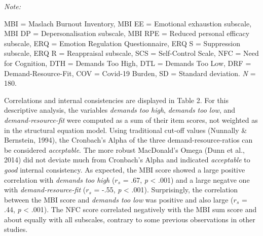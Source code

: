 \documentclass[
  english,
  man,floatsintext]{apa6}
\begin{document}
\begin{table}
{\begin{threeparttable}
\begin{tabular}[t]{lrrrrrrr}
\bottomrule
\end{tabular}
\begin{tablenotes}
\item \textit{Note: } 
\item MBI = Maslach Burnout Inventory, MBI EE = Emotional exhaustion subscale, MBI DP = Depersonalisation subscale, MBI RPE = Reduced personal efficacy subscale, ERQ = Emotion Regulation Questionnaire, ERQ S = Suppression subscale, ERQ R = Reappraisal subscale, SCS = Self-Control Scale, NFC = Need for Cognition, DTH = Demands Too High, DTL = Demands Too Low, DRF = Demand-Resource-Fit, COV = Covid-19 Burden, SD = Standard deviation. \textit{N} = 180.
\end{tablenotes}
\end{threeparttable}}
\end{table}

Correlations and internal consistencies are displayed in Table 2.
For this descriptive analysis, the variables \emph{demands too high}, \emph{demands too low}, and \emph{demand-resource-fit} were computed as a sum of their item scores, not weighted as in the structural equation model.
Using traditional cut-off values (Nunnally \& Bernstein, 1994), the Cronbach's Alpha of the three demand-resource-ratios can be considered \emph{acceptable}.
The more robust MacDonald's Omega (Dunn et al., 2014) did not deviate much from Cronbach's Alpha and indicated \emph{acceptable} to \emph{good} internal consistency.
As expected, the MBI score showed a large positive correlation with \emph{demands too high} (\(r_s\) = .67, \emph{p} \textless{} .001) and a large negatve one with \emph{demand-resource-fit} (\(r_s\) = -.55, \emph{p} \textless{} .001).
Surprisingly, the correlation between the MBI score and \emph{demands too low} was positive and also large (\(r_s\) = .44, \emph{p} \textless{} .001).
The NFC score correlated negatively with the MBI sum score and about equally with all subscales, contrary to some previous observations in other studies.
\end{document}
